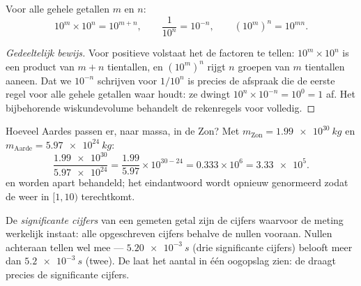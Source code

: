 \begin{proposition}\label{prop:g10:orders-of-magnitude:powers}
Voor alle gehele getallen $m$ en $n$:
\[
10^{m} \times 10^{n} = 10^{m+n}, \qquad
\frac{1}{10^{n}} = 10^{-n}, \qquad
\left(10^{m}\right)^{n} = 10^{mn}.
\]
\end{proposition}

\begin{proof}[Gedeeltelijk bewijs]
Voor positieve  volstaat het de factoren te tellen:
$10^{m} \times 10^{n}$ is een product van $m + n$ tientallen, en
$(10^m)^n$ rijgt $n$ groepen van $m$ tientallen aaneen. Dat we
$10^{-n}$ schrijven voor $1/10^{n}$ is precies de afspraak die de
eerste regel voor alle gehele getallen waar houdt: ze dwingt
$10^{n} \times 10^{-n} = 10^{0} = 1$ af. Het bijbehorende
wiskundevolume behandelt de rekenregels voor  volledig.
\end{proof}

\begin{example}\label{ex:g10:orders-of-magnitude:scinot}
Hoeveel Aardes passen er, naar massa, in de Zon? Met
$m_{\text{Zon}} = \qty{1.99e30}{kg}$ en
$m_{\text{Aarde}} = \qty{5.97e24}{kg}$:
\[
\frac{\num{1.99e30}}{\num{5.97e24}}
= \frac{1.99}{5.97} \times 10^{30-24}
= 0.333 \times 10^{6}
= \num{3.33e5}.
\]
 en  worden apart behandeld; het eindantwoord wordt
opnieuw genormeerd zodat de  weer in $[1, 10)$ terechtkomt.
\end{example}

\begin{definition}\label{def:g10:orders-of-magnitude:sigfig}
De \emph{significante cijfers} van een
gemeten getal zijn de cijfers waarvoor de meting werkelijk instaat:
alle opgeschreven cijfers behalve de nullen vooraan. Nullen achteraan
tellen wel mee --- $\qty{5.20e-3}{s}$ (drie significante cijfers)
belooft meer dan $\qty{5.2e-3}{s}$ (twee). De  laat het aantal in één oogopslag zien: de  draagt
precies de significante cijfers.
\end{definition}

